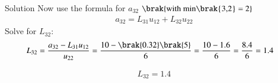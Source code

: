 \documentclass{beamer}
\begin{document}
\begin{frame}{Solution}
Now use the formula for $a_{32}$ $\brak{\text{with   min\brak{3,2} = 2}}$
\begin{align}
a_{32} = L_{31}u_{12} + L_{32}u_{22}
\end{align}
Solve for $L_{32}$:
\begin{align}
L_{32} &= \frac{a_{32} - L_{31}u_{12}}{u_{22}}
= \frac{10 - \brak{0.32}\brak{5}}{6}
= \frac{10 - 1.6}{6}
= \frac{8.4}{6}
= 1.4
\end{align}

\begin{align}
L_{32} = 1.4
\end{align}
\end{frame}
\end{document}
